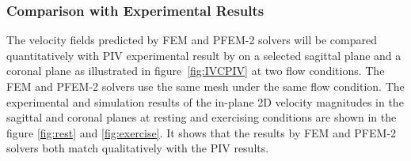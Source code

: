 \subsubsection*{Comparison with Experimental Results}

The velocity fields predicted by FEM and PFEM-2 solvers will be compared quantitatively with PIV experimental result by \cite{gallagher_exp} on a selected sagittal plane and a coronal plane as illustrated in figure~\ref{fig:IVCPIV} at two flow conditions. The FEM and PFEM-2 solvers use the same mesh under the same flow condition. The experimental and simulation results of the in-plane 2D velocity magnitudes in the sagittal and coronal planes at resting and exercising conditions are shown in the figure \ref{fig:rest} and \ref{fig:exercise}. It shows that the results by FEM and PFEM-2 solvers both match qualitatively with the PIV results. 

